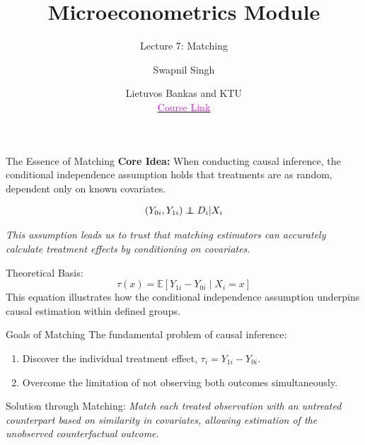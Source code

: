 \documentclass{beamer}
\title{Microeconometrics Module}
\subtitle{Lecture 7: Matching}
\author{Swapnil Singh}
\date{Lietuvos Bankas and KTU \\ \href{https://github.com/swapnil1987/econometrics-2024}{\textcolor{magenta}{Course Link}}}
\theoremstyle{plain}
\newcommand\independent{\protect\mathpalette{\protect\independenT}{\perp}}
\def\independenT#1#2{\mathrel{\rlap{$#1#2$}\mkern2mu{#1#2}}}
\begin{document}
	
	\maketitle
	


\begin{frame}{The Essence of Matching}
	\textbf{Core Idea:} When conducting causal inference, the conditional independence assumption holds that treatments are as random, dependent only on known covariates.
	
	\begin{align*}
		\left(Y_{0i}, Y_{1i}\right) \independent D_i | X_i
	\end{align*}
	
	\vspace{1em}
	\textit{This assumption leads us to trust that matching estimators can accurately calculate treatment effects by conditioning on covariates.}
	
	\vspace{1em}
	Theoretical Basis:
	\[
	\tau(x) = \mathbb{E}[ Y_{1i} - Y_{0i} \mid X_i = x ]
	\]
	This equation illustrates how the conditional independence assumption underpins causal estimation within defined groups.
\end{frame}


\begin{frame}{Goals of Matching}
	The fundamental problem of causal inference:
	\begin{enumerate}
		\item Discover the individual treatment effect, $\tau_i = Y_{1i} - Y_{0i}$.
		\item Overcome the limitation of not observing both outcomes simultaneously.
	\end{enumerate}
	
	\vspace{1em}
	Solution through Matching:
	\textit{Match each treated observation with an untreated counterpart based on similarity in covariates, allowing estimation of the unobserved counterfactual outcome.}
\end{frame}
\end{document}
